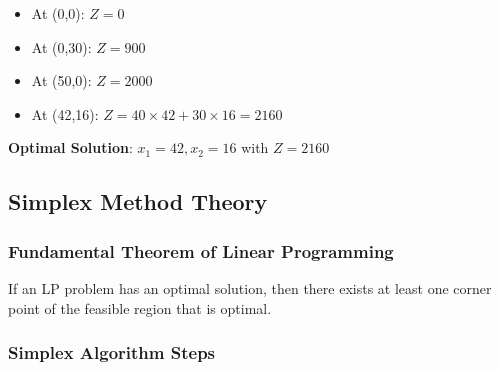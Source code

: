 \documentclass[
  letterpaper,
  DIV=11,
  numbers=noendperiod]{scrreprt}
\providecommand{\tightlist}{%
  \setlength{\itemsep}{0pt}\setlength{\parskip}{0pt}}
\begin{document}
\begin{itemize}
\tightlist
\item
  At (0,0): \(Z = 0\)
\item
  At (0,30): \(Z = 900\)
\item
  At (50,0): \(Z = 2000\)
\item
  At (42,16): \(Z = 40×42 + 30×16 = 2160\)
\end{itemize}

\textbf{Optimal Solution}: \(x_1 = 42, x_2 = 16\) with \(Z = 2160\)

\subsection{Simplex Method Theory}\label{simplex-method-theory}

\subsubsection{Fundamental Theorem of Linear
Programming}\label{fundamental-theorem-of-linear-programming}

If an LP problem has an optimal solution, then there exists at least one
corner point of the feasible region that is optimal.

\subsubsection{Simplex Algorithm Steps}\label{simplex-algorithm-steps}
\end{document}
